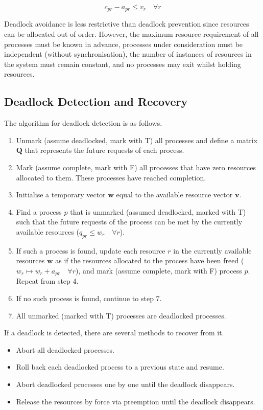 \begin{equation*}
  c_{pr} - a_{pr} \le v_r \quad \forall r
\end{equation*}

Deadlock avoidance is less restrictive than deadlock prevention since resources can be allocated out of order.
However, the maximum resource requirement of all processes must be known in advance, processes under consideration must be independent (without synchronisation), the number of instances of resources in the system must remain constant, and no processes may exit whilst holding resources.

\subsection{Deadlock Detection and Recovery}

The algorithm for deadlock detection is as follows.
\begin{enumerate}
  \item Unmark (assume deadlocked, mark with T) all processes and define a matrix \( \mathbf{Q} \) that represents the future requests of each process.
  \item Mark (assume complete, mark with F) all processes that have zero resources allocated to them.
  These processes have reached completion.
  \item Initialise a temporary vector \( \mathbf{w} \) equal to the available resource vector \( \mathbf{v} \).
  \item Find a process \( p \) that is unmarked (assumed deadlocked, marked with T) such that the future requests of the process can be met by the currently available resources (\( q_{pr} \le w_r \quad \forall r \)).
  \item If such a process is found, update each resource \( r \) in the currently available resources \( \mathbf{w} \) as if the resources allocated to the process have been freed (\( w_r \mapsto w_r + a_{pr} \quad \forall r \)), and mark (assume complete, mark with F) process \( p \).
  Repeat from step \num{4}.
  \item If no such process is found, continue to step \num{7}.
  \item All unmarked (marked with T) processes are deadlocked processes.
\end{enumerate}

If a deadlock is detected, there are several methods to recover from it.
\begin{itemize}
  \item Abort all deadlocked processes.
  \item Roll back each deadlocked process to a previous state and resume.
  \item Abort deadlocked processes one by one until the deadlock disappears.
  \item Release the resources by force via preemption until the deadlock disappears.
\end{itemize}

